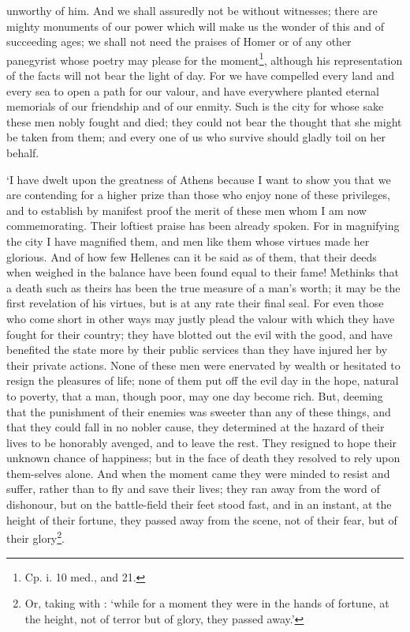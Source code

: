 unworthy of him. And we shall assuredly not be without witnesses;
there are mighty monuments of our power which will make us the wonder
of this and of succeeding ages; we shall not need the praises of Homer
or of any other panegyrist whose poetry may please for the
moment\footnote{Cp. i. 10 med., and 21.},  although his
representation of the facts will not bear the light of day. For we
have compelled every land and every sea to open a path for our valour,
and have everywhere planted eternal memorials of our friendship and of
our enmity. Such is the city for whose sake these men nobly fought and
died; they could not bear the thought that she might be taken from
them; and every one of us who survive should gladly toil on her
behalf.

`I have dwelt upon the greatness of Athens because I want to show you
that we are contending for a higher prize than those who enjoy none of
these privileges, and to establish by manifest proof the merit of
these men whom I am now commemorating. Their loftiest praise has been
already spoken. For in magnifying the city I have magnified them, and
men like them whose virtues made her glorious. And of how few Hellenes
can it be said as of them, that their deeds when weighed in the
balance have been found equal to their fame! Methinks that a death
such as theirs has been the true measure of a man's worth; it may be
the first revelation of his virtues, but is at any rate their final
seal. For even those who come short in other ways may justly plead the
valour with which they have fought for their country; they have
blotted out the evil with the good, and have benefited the state more
by their public services than they have injured her by their private
actions. None of these men were enervated by wealth or hesitated to
resign the pleasures of life; none of them put off the evil day in the
hope, natural to poverty, that a man, though poor, may one day become
rich. But, deeming that the punishment of their enemies was sweeter
than any of these things, and that they could fall in no nobler cause,
they determined at the hazard of their lives to be honorably avenged,
and to leave the rest. They resigned to hope their unknown chance of
happiness; but in the face of death they resolved to rely upon
them-selves alone. And when the moment came they were minded
to resist and suffer, rather than to fly and save their lives; they
ran away from the word of dishonour, but on the battle-field their
feet stood fast, and in an instant, at the height of their fortune,
they passed away from the scene, not of their fear, but of their
glory\footnote{Or, taking  with : `while for a
moment they were in the hands of fortune, at the height, not of terror
but of glory, they passed away.'}.

